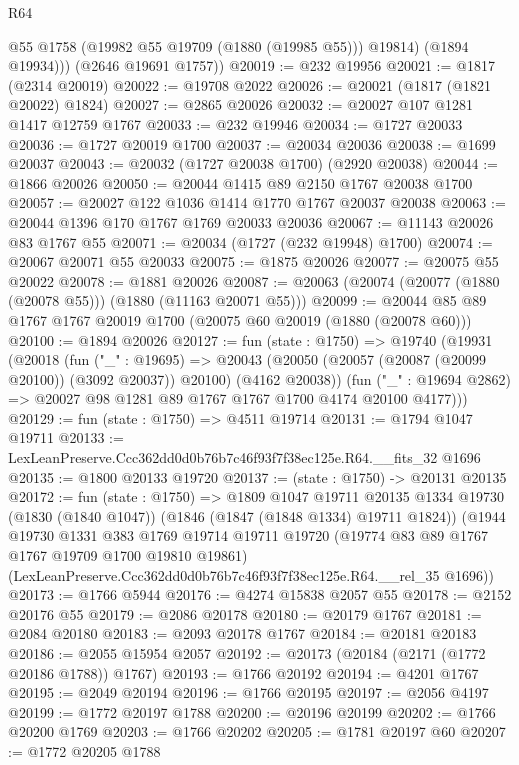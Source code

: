 \begin{lexlean}{R64}
\begin{coremodule}
            @55
            @1758
            (@19982 @55 @19709 (@1880 (@19985 @55)))
            @19814)
          (@1894 @19934)))
      (@2646 @19691 @1757))
@20019 := @232 @19956
@20021 := @1817 (@2314 @20019)
@20022 := @19708 @2022
@20026 := @20021 (@1817 (@1821 @20022) @1824)
@20027 := @2865 @20026
@20032 := @20027 @107 @1281 @1417 @12759 @1767
@20033 := @232 @19946
@20034 := @1727 @20033
@20036 := @1727 @20019 @1700
@20037 := @20034 @20036
@20038 := @1699 @20037
@20043 := @20032 (@1727 @20038 @1700) (@2920 @20038)
@20044 := @1866 @20026
@20050 := @20044 @1415 @89 @2150 @1767 @20038 @1700
@20057 := @20027 @122 @1036 @1414 @1770 @1767 @20037 @20038
@20063 := @20044 @1396 @170 @1767 @1769 @20033 @20036
@20067 := @11143 @20026 @83 @1767 @55
@20071 := @20034 (@1727 (@232 @19948) @1700)
@20074 := @20067 @20071 @55 @20033
@20075 := @1875 @20026
@20077 := @20075 @55 @20022
@20078 := @1881 @20026
@20087 := @20063 (@20074 (@20077 (@1880 (@20078 @55))) (@1880 (@11163 @20071 @55)))
@20099 := @20044 @85 @89 @1767 @1767 @20019 @1700 (@20075 @60 @20019 (@1880 (@20078 @60)))
@20100 := @1894 @20026
@20127 := fun (state : @1750) =>
  @19740
    (@19931
      (@20018
        (fun ("_" : @19695) =>
        @20043 (@20050 (@20057 (@20087 (@20099 @20100)) (@3092 @20037)) @20100) (@4162 @20038))
        (fun ("_" : @19694 @2862) => @20027 @98 @1281 @89 @1767 @1767 @1700 @4174 @20100 @4177)))
@20129 := fun (state : @1750) => @4511 @19714
@20131 := @1794 @1047 @19711
@20133 := LexLeanPreserve.Ccc362dd0d0b76b7c46f93f7f38ec125e.R64.__fits_32 @1696
@20135 := @1800 @20133 @19720
@20137 := (state : @1750) -> @20131 @20135
@20172 := fun (state : @1750) =>
  @1809
    @1047
    @19711
    @20135
    @1334
    @19730
    (@1830 (@1840 @1047))
    (@1846 (@1847 (@1848 @1334) @19711 @1824))
    (@1944
      @19730
      @1331
      @383
      @1769
      @19714
      @19711
      @19720
      (@19774 @83 @89 @1767 @1767 @19709 @1700 @19810 @19861)
      (LexLeanPreserve.Ccc362dd0d0b76b7c46f93f7f38ec125e.R64.__rel_35 @1696))
@20173 := @1766 @5944
@20176 := @4274 @15838 @2057 @55
@20178 := @2152 @20176 @55
@20179 := @2086 @20178
@20180 := @20179 @1767
@20181 := @2084 @20180
@20183 := @2093 @20178 @1767
@20184 := @20181 @20183
@20186 := @2055 @15954 @2057
@20192 := @20173 (@20184 (@2171 (@1772 @20186 @1788)) @1767)
@20193 := @1766 @20192
@20194 := @4201 @1767
@20195 := @2049 @20194
@20196 := @1766 @20195
@20197 := @2056 @4197
@20199 := @1772 @20197 @1788
@20200 := @20196 @20199
@20202 := @1766 @20200 @1769
@20203 := @1766 @20202
@20205 := @1781 @20197 @60
@20207 := @1772 @20205 @1788

\end{coremodule}
\end{lexlean}
